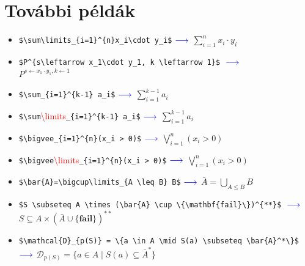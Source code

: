 \documentclass[a4paper,12pt]{article}
\begin{document}
\section*{További példák}
\begin{itemize}
\item \verb|$\sum\limits_{i=1}^{n}x_i\cdot y_i$| \qquad\qquad $\color{my_color}\longrightarrow$ \qquad\qquad $\sum\limits_{i=1}^{n}x_i\cdot y_i$

\item \verb|$P^{s\leftarrow x_1\cdot y_1, k \leftarrow 1}$| \qquad\qquad $\color{my_color}\\
\longrightarrow$\\
\qquad\qquad $P^{s\leftarrow x_1\cdot y_1, k \leftarrow 1}$

\item \verb|$\sum_{i=1}^{k-1} a_i$| \qquad\qquad $\color{my_color}\longrightarrow$ \qquad\qquad $\sum_{i=1}^{k-1} a_i$

\item \verb|$\sum|\textcolor{red}{\textbackslash limits}\verb|_{i=1}^{k-1} a_i$| \qquad\qquad $\color{my_color}\longrightarrow$ \qquad\qquad $\sum\limits_{i=1}^{k-1} a_i$

\item \verb|$\bigvee_{i=1}^{n}(x_i > 0)$| \qquad\qquad $\color{my_color}\longrightarrow$ \qquad\qquad $\bigvee_{i=1}^{n}(x_i > 0)$
	
\item \verb|$\bigvee|\textcolor{red}{\textbackslash limits}\verb|_{i=1}^{n}(x_i > 0)$| \qquad\qquad $\color{my_color}\longrightarrow$ \qquad\qquad $\bigvee\limits_{i=1}^{n}(x_i > 0)$
			
\item \verb|$\bar{A}=\bigcup\limits_{A \leq B} B$| \qquad\qquad $\color{my_color}\longrightarrow$ \qquad\qquad $\bar{A}=\bigcup\limits_{A \leq B} B$
	
\item \verb|$S \subseteq A \times (\bar{A} \cup \{\mathbf{fail}\})^{**}$| \qquad\qquad $\color{my_color}\\
\longrightarrow$\\
\qquad\qquad $S \subseteq A \times (\bar{A} \cup \{\mathbf{fail}\})^{**}$
	
\item \verb|$\mathcal{D}_{p(S)} = \{a \in A \mid S(a) \subseteq \bar{A}^*\}$| \qquad\qquad $\color{my_color}\longrightarrow$ \qquad\qquad $\mathcal{D}_{p(S)} = \{a \in A \mid S(a) \subseteq \bar{A}^*\}$
		
\end{itemize}
\end{document}
